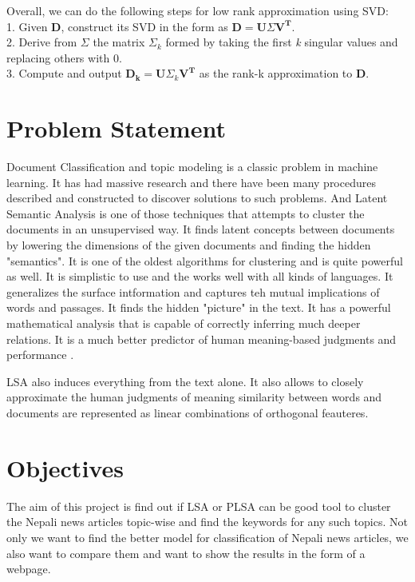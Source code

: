 \documentclass[12pt]{article}
\begin{document}
        Overall, we can do the following steps for low rank approximation using SVD:\\
        1. Given \textbf{D}, construct its SVD in the form as ${\mathbf{D} = \mathbf{U} \Sigma  \mathbf{V^T}}$.\\
        2. Derive from ${\Sigma}$ the matrix ${\Sigma_k}$ formed by taking the first \emph{k} singular values and replacing others with 0.\\
        3. Compute and output ${\mathbf{D_k} = \mathbf{U} \Sigma_k  \mathbf{V^T}}$ as the rank-k approximation to \textbf{D}.\cite{cambridge2009online}
       

        
    \section{Problem Statement}
        Document Classification and topic modeling is a classic problem in machine learning. It has had massive research and there have been many procedures described and
        constructed to discover solutions to such problems. And Latent Semantic Analysis is one of those techniques that attempts to cluster the documents in an unsupervised 
        way. It finds latent concepts between documents by lowering the dimensions of the given documents and finding the hidden "semantics". It is one of the oldest algorithms
        for clustering and is quite powerful as well. It is simplistic to use and the works well with all kinds of languages. It generalizes the surface intformation and captures teh mutual 
        implications of words and passages. It finds the hidden "picture" in the text. It has a powerful mathematical analysis that is capable of correctly inferring much deeper 
        relations. It is a much better predictor of human meaning-based judgments and performance \cite{landauer1998introduction}.
        
        LSA also induces everything from the text alone. It also allows to closely approximate the human judgments of meaning similarity between words and documents are 
        represented as linear combinations of orthogonal feauteres. 
    
    \section{Objectives}
        The aim of this project is find out if LSA or PLSA can be good tool to cluster the Nepali news articles topic-wise and find the keywords for any such topics. Not only 
        we want to find the better model for classification of Nepali news articles, we also want to compare them and want to show the results in the form of a webpage.
\end{document}
